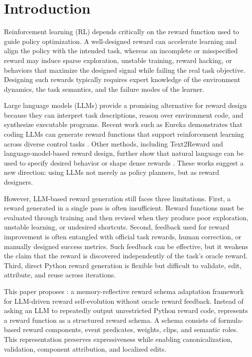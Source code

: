 \section{Introduction}

Reinforcement learning (RL) depends critically on the reward function used to guide policy optimization. A well-designed reward can accelerate learning and align the policy with the intended task, whereas an incomplete or misspecified reward may induce sparse exploration, unstable training, reward hacking, or behaviors that maximize the designed signal while failing the real task objective. Designing such rewards typically requires expert knowledge of the environment dynamics, the task semantics, and the failure modes of the learner.

Large language models (LLMs) provide a promising alternative for reward design because they can interpret task descriptions, reason over environment code, and synthesize executable programs. Recent work such as Eureka demonstrates that coding LLMs can generate reward functions that support reinforcement learning across diverse control tasks \cite{ma2023eureka}. Other methods, including Text2Reward and language-model-based reward design, further show that natural language can be used to specify desired behavior or shape dense rewards \cite{xie2023text2reward,kwon2023rewarddesign}. These works suggest a new direction: using LLMs not merely as policy planners, but as reward designers.

However, LLM-based reward generation still faces three limitations. First, a reward generated in a single pass is often insufficient. Reward functions must be evaluated through training and then revised when they produce poor exploration, unstable learning, or undesired shortcuts. Second, feedback used for reward improvement is often entangled with official task rewards, human correction, or manually designed success metrics. Such feedback can be effective, but it weakens the claim that the reward is discovered independently of the task's oracle reward. Third, direct Python reward generation is flexible but difficult to validate, edit, attribute, and reuse across iterations.

This paper proposes \methodname{}: a memory-reflective reward schema adaptation framework for LLM-driven reward self-evolution without oracle reward feedback. Instead of asking an LLM to repeatedly output unrestricted Python reward code, \methodname{} represents a reward function as a structured reward schema. A schema consists of formula-based reward components, event predicates, weights, clips, and semantic roles. This representation preserves expressiveness while enabling canonicalization, validation, component attribution, and localized edits.

